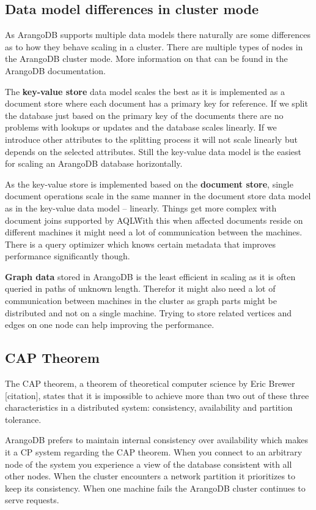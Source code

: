 \subsection{Data model differences in cluster mode}
As ArangoDB supports multiple data models there naturally are some differences as to how they behave scaling in a cluster. There are multiple types of nodes in the ArangoDB cluster mode. More information on that can be found in the ArangoDB documentation.
\medskip

The \textbf{key-value store} data model scales the best as it is implemented as a document store where each document has a primary key for reference. If we split the database just based on the primary key of the documents there are no problems with lookups or updates and the database scales linearly. If we introduce other attributes to the splitting process it will not scale linearly but depends on the selected attributes. Still the key-value data model is the easiest for scaling an ArangoDB database horizontally.
\medskip

As the key-value store is implemented based on the \textbf{document store}, single document operations scale in the same manner in the document store data model as in the key-value data model -- linearly. Things get more complex with document joins supported by AQL\. With this when affected documents reside on different machines it might need a lot of communication between the machines. There is a query optimizer which knows certain metadata that improves performance significantly though.
\medskip

\textbf{Graph data} stored in ArangoDB is the least efficient in scaling as it is often queried in paths of unknown length. Therefor it might also need a lot of communication between machines in the cluster as graph parts might be distributed and not on a single machine. Trying to store related vertices and edges on one node can help improving the performance.
\cite{ArangoCluster}

\subsection{CAP Theorem}
The CAP theorem, a theorem of theoretical computer science by Eric Brewer [citation], states that it is impossible to achieve more than two out of these three characteristics in a distributed system: consistency, availability and partition tolerance.

ArangoDB prefers to maintain internal consistency over availability which makes it a CP system regarding the CAP theorem. When you connect to an arbitrary node of the system you experience a view of the database consistent with all other nodes. When the cluster encounters a network partition it prioritizes to keep its consistency. When one machine fails the ArangoDB cluster continues to serve requests.
\cite{ArangoCluster}

